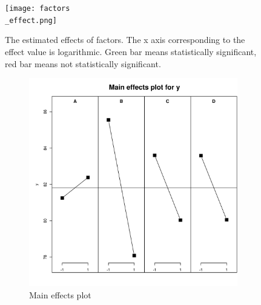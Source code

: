 \documentclass{article}
\begin{document}
\begin{figure}[!ht]
    \centering
    \texttt{[image: factors\\\_effect.png]}
    \caption{The estimated effects of factors. The x axis corresponding to the effect value is logarithmic. Green bar means statistically significant, red bar means not statistically significant.}
    \label{fig:factors_effect}
\end{figure}

\begin{figure}[!ht]
    \begin{subfigure}{0.49\textwidth}
        \centering
        \includegraphics[width=\textwidth]{main_effects_plot.jpeg}
        \caption{Main effects plot}
        \label{fig:main_effects_plot}
    \end{subfigure}
    \begin{subfigure}{0.49\textwidth}
        \centering

\end{subfigure}
\end{figure}
\end{document}
